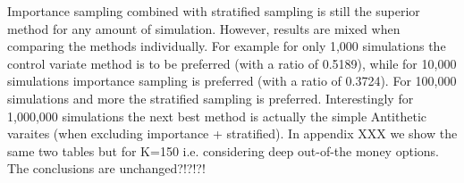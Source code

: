 \documentclass[11pt,a4paper,oneside]{article}
\begin{document}
Importance sampling combined with stratified sampling is still the superior method for any amount of simulation. However, results are mixed when comparing the methods individually. For example for only 1,000 simulations the control variate method is to be preferred (with a ratio of 0.5189), while for 10,000 simulations importance sampling is preferred (with a ratio of 0.3724). For 100,000 simulations and more the stratified sampling is preferred. Interestingly for 1,000,000 simulations the next best method is actually the simple Antithetic varaites (when excluding importance + stratified). In appendix XXX we show the same two tables but for K=150 i.e. considering deep out-of-the money options. The conclusions are unchanged?!?!?!  



\end{document}
